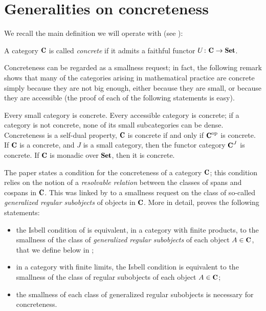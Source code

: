 \documentclass[a4paper, 10pt]{amsart}
\begin{document}
\section{Generalities on concreteness}
We recall the main definition we will operate with (see \cite{Bor1,McL}):
\begin{definition}\label{concrecat} A category $\C$ is called \emph{concrete} if
it admits a faithful functor $U\colon \C \to \Sets$.
\end{definition} Concreteness can be regarded as a smallness request; in fact,
the following remark shows that many of the categories arising in mathematical
practice are concrete simply because they are not big enough, either because
they are small, or because they are accessible (the proof of each of the
following statements is easy).
\begin{remark}\label{all-is-conc} Every small
category is concrete. Every accessible category is concrete; if a category is
not concrete, none of its small subcategories can be dense. Concreteness is a
self-dual property, \ie $\C$ is concrete if and only if $\C^\opp$ is concrete.
If $\C$ is a concrete, and $J$ is a small category, then the functor category
$\C^J$ is concrete. If $\C$ is monadic over $\Set$, then it is concrete.
\end{remark} 
The paper \cite{Isbell1964} states a condition for the concreteness of a category $\C$; this condition relies on the notion of a \emph{resolvable relation} between the classes of spans and cospans in $\C$. This was linked by \cite{freyd1973concreteness} to a smallness request on the class of so-called \emph{generalized regular subobjects} of objects in $\C$. More in detail, \cite{freyd1973concreteness} proves the following statements:
\begin{itemize}
	\item the Isbell condition of \cite{Isbell1964} is equivalent, in a category with finite products, to the smallness of the class of \emph{generalized regular subobjects} of each object $A\in\C$, that we define below in ;
	\item in a category with finite limits, the Isbell condition is equivalent to the smallness of the class of regular subobjects of each object $A\in\C$;
	\item the smallness of each class of generalized regular subobjects is necessary for concreteness.
\end{itemize}
\end{document}
